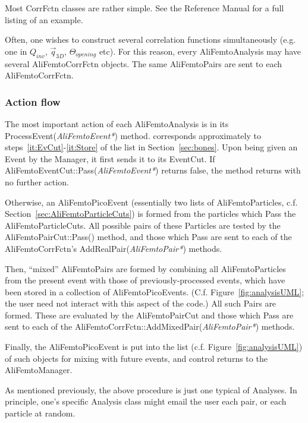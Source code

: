 \documentclass[twoside]{article}
\newcommand{\name}[1]{\textsf{#1}}%
\newcommand{\args}[1]{\textit{#1}}%
\newcommand{\meth}[1]{\textsf{#1}}%
\begin{document}
Most CorrFctn classes are rather simple.  See the Reference Manual for a full listing of an example.

Often, one wishes to construct several correlation functions simultaneously (e.g. one in $Q_{inv}$, $\vec{q}_{3D}$, $\Theta_{opening}$ etc).
For this reason, every \name{AliFemtoAnalysis} may have several \name{AliFemtoCorrFctn} objects.
The same \name{AliFemtoPair}s are sent to each \name{AliFemtoCorrFctn}.


\subsubsection{Action flow}

The most important action of each \name{AliFemtoAnalysis} is in its \meth{ProcessEvent(\args{AliFemtoEvent*})} method.
corresponds approximately to steps~\ref{it:EvCut}-\ref{it:Store} of the list in Section~\ref{sec:bones}.
Upon being given an Event by the Manager, it first sends it to its EventCut.  If \name{AliFemtoEventCut::\meth{Pass(\args{AliFemtoEvent*})}}
returns false, the  method returns with no further action.

Otherwise, an \name{AliFemtoPicoEvent} (essentially two lists of \name{AliFemtoParticle}s, c.f. Section~\ref{sec:AliFemtoParticleCuts}) is formed from 
the particles which Pass the \name{AliFemtoParticleCuts}.  All possible pairs of these Particles are tested by the 
\name{AliFemtoPairCut::\meth{Pass()}} method,
and those which Pass are sent to each of the \name{AliFemtoCorrFctn}'s \meth{AddRealPair(\args{AliFemtoPair*})} methods.

Then, ``mixed'' \name{AliFemtoPair}s are formed by combining all \name{AliFemtoParticles} from the present event with those of previously-processed
events, which have been stored in a collection of \name{AliFemtoPicoEvents}.  (C.f. Figure~\ref{fig:analysisUML}; the user need not interact
with this aspect of the code.)  All such Pairs are formed.  These are evaluated by the \name{AliFemtoPairCut} and those which Pass are sent to
each of the \name{AliFemtoCorrFctn::\meth{AddMixedPair(\args{AliFemtoPair*})}} methods.

Finally, the AliFemtoPicoEvent is put into the list (c.f. Figure~\ref{fig:analysisUML}) of such objects for mixing with future events,
and control returns to the AliFemtoManager.

As mentioned previously, the above procedure is just one typical of Analyses.  In principle, one's specific Analysis class might
email the user each pair, or each particle at random.
\end{document}

